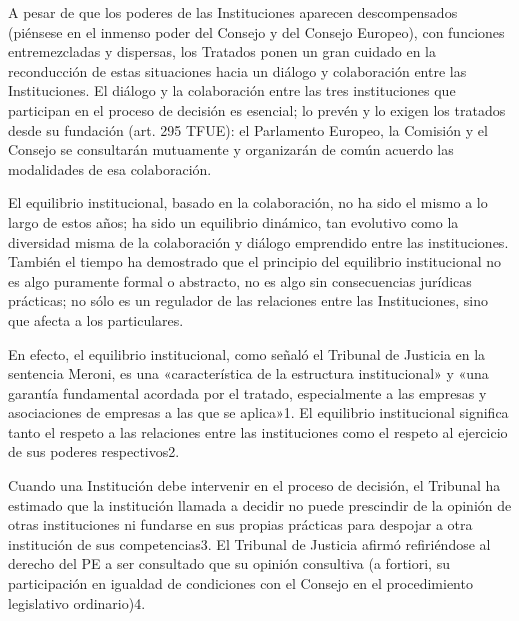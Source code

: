 \documentclass[10pt,a4paper]{article}
\begin{document}
A pesar de que los poderes de las Instituciones aparecen descompensados (piénsese en el inmenso poder del Consejo y del Consejo Europeo), con funciones entremezcladas y dispersas, los Tratados ponen un gran cuidado en la reconducción de estas situaciones hacia un diálogo y colaboración entre las Instituciones. El diálogo y la colaboración entre las tres instituciones que participan en el proceso de decisión es esencial; lo prevén y lo exigen los tratados desde su fundación (art. 295 TFUE): el Parlamento Europeo, la Comisión y el Consejo se consultarán mutuamente y organizarán de común acuerdo las modalidades de esa colaboración.

El equilibrio institucional, basado en la colaboración, no ha sido el mismo a lo largo de estos años; ha sido un equilibrio dinámico, tan evolutivo como la diversidad misma de la colaboración y diálogo emprendido entre las instituciones. También el tiempo ha demostrado que el principio del equilibrio institucional no es algo puramente formal o abstracto, no es algo sin consecuencias jurídicas prácticas; no sólo es un regulador de las relaciones entre las Instituciones, sino que afecta a los particulares.

En efecto, el equilibrio institucional, como señaló el Tribunal de Justicia en la sentencia Meroni, es una «característica de la estructura institucional» y «una garantía fundamental acordada por el tratado, especialmente a las empresas y asociaciones de empresas a las que se aplica»1. El equilibrio institucional significa tanto el respeto a las relaciones entre las instituciones como el respeto al ejercicio de sus poderes respectivos2.

Cuando una Institución debe intervenir en el proceso de decisión, el Tribunal ha estimado que la institución llamada a decidir no puede prescindir de la opinión de otras instituciones ni fundarse en sus propias prácticas para despojar a otra institución de sus competencias3. El Tribunal de Justicia afirmó refiriéndose al derecho del PE a ser consultado que su opinión consultiva (a fortiori, su participación en igualdad de condiciones con el Consejo en el procedimiento legislativo ordinario)4.
\end{document}
